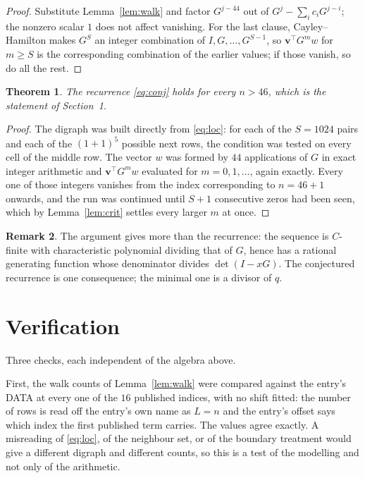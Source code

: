 \documentclass[11pt,a4paper]{article}
\theoremstyle{plain}
\newtheorem{theorem}{Theorem}
\theoremstyle{definition}
\newtheorem{remark}[theorem]{Remark}
\begin{document}
\begin{proof}
Substitute Lemma~\ref{lem:walk} and factor $G^{j-44}$ out of
$G^{j}-\sum_ic_iG^{j-i}$; the nonzero scalar $1$ does not affect
vanishing. For the last clause, Cayley--Hamilton makes $G^{S}$ an integer combination of
$I,G,\dots,G^{S-1}$, so $\mathbf{v}^{\!\top}G^{m}w$ for $m\ge S$ is the corresponding
combination of the earlier values; if those vanish, so do all the rest.
\end{proof}

\begin{theorem}
The recurrence \eqref{eq:conj} holds for every $n>46$, which is the statement of
Section~1.
\end{theorem}

\begin{proof}
The digraph was built directly from \eqref{eq:loc}: for each of the $S=1024$ pairs and each
of the $(1+1)^{5}$ possible next rows, the condition was tested on every cell of
the middle row. The vector $w$ was formed by $44$ applications of $G$ in exact integer
arithmetic and $\mathbf{v}^{\!\top}G^{m}w$ evaluated for $m=0,1,\dots$, again exactly.
Every one of those integers vanishes from the index corresponding to $n=46+1$ onwards,
and the run was continued until $S+1$ consecutive zeros had been seen, which by
Lemma~\ref{lem:crit} settles every larger $m$ at once.
\end{proof}

\begin{remark}
The argument gives more than the recurrence: the sequence is $C$-finite with characteristic
polynomial dividing that of $G$, hence has a rational generating function whose denominator
divides $\det(I-xG)$. The conjectured recurrence is one consequence; the minimal one is a
divisor of $q$.
\end{remark}

\section{Verification}

Three checks, each independent of the algebra above.

First, the walk counts of Lemma~\ref{lem:walk} were compared against the entry's DATA at
every one of the $16$ published indices, with no shift fitted: the number of rows is
read off the entry's own name as $L=n$ and the entry's offset says which index the first
published term carries. The values agree exactly. A misreading of \eqref{eq:loc}, of the
neighbour set, or of the boundary treatment would give a different digraph and different
counts, so this is a test of the modelling and not only of the arithmetic.
\end{document}
